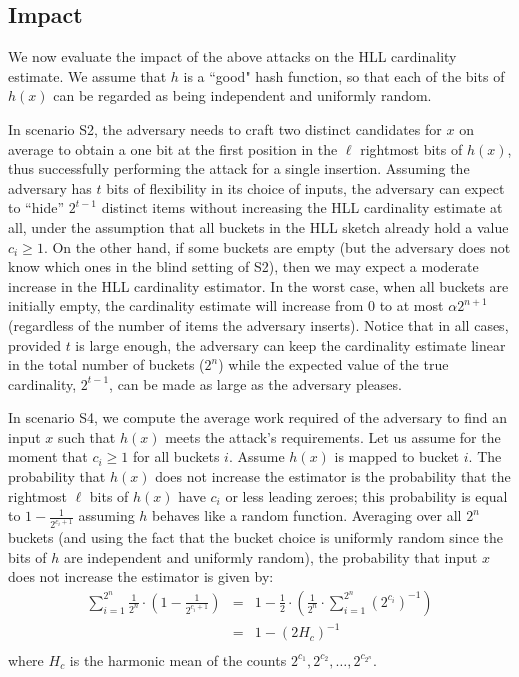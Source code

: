 \documentclass{IEEEtran}
\begin{document}
\subsection{Impact}
We now evaluate the impact of the above attacks on the HLL cardinality estimate. We assume that $h$ is a ``good" hash function, so that each of the bits of $h(x)$ can be regarded as being independent and uniformly random.

In scenario S2, the adversary needs to craft two distinct candidates for $x$ on average to obtain a one bit at the first position in the $\ell$ rightmost bits of $h(x)$, thus successfully performing the attack for a single insertion. Assuming the adversary has $t$ bits of flexibility in its choice of inputs, the adversary can expect to ``hide''  $2^{t-1}$ distinct items without increasing the HLL cardinality estimate at all, under the assumption that all buckets in the HLL sketch already hold a value $c_i \ge 1$. On the other hand, if some buckets are empty (but the adversary does not know which ones in the blind setting of S2), then we may expect a moderate increase in the HLL cardinality estimator. In the worst case, when all buckets are initially empty, the cardinality estimate will increase from 0 to at most $\alpha2^{n+1}$ (regardless of the number of items the adversary inserts). Notice that in all cases, provided $t$ is large enough, the adversary can keep the cardinality estimate linear in the total number of buckets ($2^n$) while the expected value of the true cardinality, $2^{t-1}$, can be made as large as the adversary pleases.

In scenario S4, we compute the average work required of the adversary to find an input $x$ such that $h(x)$ meets the attack's requirements. Let us assume for the moment that $c_i \ge 1$ for all buckets $i$. Assume $h(x)$ is mapped to bucket $i$. The probability that $h(x)$ does not increase the estimator is the probability that the  rightmost $\ell$ bits of $h(x)$ have $c_i$ or less leading zeroes; this probability is equal to $1-\frac{1}{2^{c_i+1}}$ assuming $h$ behaves like a random function. Averaging over all $2^n$ buckets (and using the fact that the bucket choice is uniformly random since the bits of $h$ are independent and uniformly random), the probability that input $x$ does not increase the estimator is given by:
\begin{eqnarray*}
\sum_{i=1}^{2^n}\frac{1}{2^n} \cdot (1-\frac{1}{2^{c_i+1}}) & = & 1-\frac{1}{2}\cdot (\frac{1}{2^n}\cdot \sum_{i=1}^{2^n} {(2^{c_i})}^{-1}) \\
& = &1-(2H_c)^{-1} \\
\end{eqnarray*}
where $H_c$ is the harmonic mean of the counts $2^{c_1}, 2^{c_2}, \ldots, 2^{c_{2^n}}$.
\end{document}
